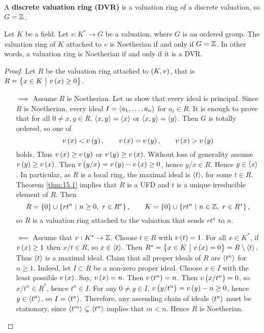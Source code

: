 
\begin{definition}
A \textbf{discrete valuation ring (DVR)} is a valuation ring of a discrete valuation, so $ G = \mathbb{Z} $.
\end{definition}

\begin{theorem}
\label{thm:15.4}
Let $ K $ be a field. Let $ v : K^* \to G $ be a valuation, where $ G $ is an ordered group. The valuation ring of $ K $ attached to $ v $ is Noetherian if and only if $ G = \mathbb{Z} $. In other words, a valuation ring is Noetherian if and only if it is a DVR.
\end{theorem}

\begin{proof}
Let $ R $ be the valuation ring attached to $ \br{K, v} $, that is $ R = \cbr{x \in K \st v\br{x} \ge 0} $.
\begin{itemize}
\item[$ \implies $] Assume $ R $ is Noetherian. Let us show that every ideal is principal. Since $ R $ is Noetherian, every ideal $ I = \left\langle a_1, \dots, a_n \right\rangle $ for $ a_i \in R $. It is enough to prove that for all $ 0 \ne x, y \in R $, $ \left\langle x, y \right\rangle = \left\langle x \right\rangle $ or $ \left\langle x, y \right\rangle = \left\langle y \right\rangle $. Then $ G $ is totally ordered, so one of
$$ v\br{x} < v\br{y}, \qquad v\br{x} = v\br{y}, \qquad v\br{x} > v\br{y} $$
holds. Thus $ v\br{x} \ge v\br{y} $ or $ v\br{y} \ge v\br{x} $. Without loss of generality assume $ v\br{y} \ge v\br{x} $. Then $ v\br{y / x} = v\br{y} - v\br{x} \ge 0 $, hence $ y / x \in R $. Hence $ y \in \left\langle x \right\rangle $. In particular, as $ R $ is a local ring, the maximal ideal is $ \left\langle t \right\rangle $, for some $ t \in R $. Theorem \ref{thm:15.1} implies that $ R $ is a UFD and $ t $ is a unique irreducible element of $ R $. Then
$$ R = \cbr{0} \cup \cbr{rt^n \st n \ge 0, \ r \in R^*}, \qquad K = \cbr{0} \cup \cbr{rt^n \st n \in \ZZ, \ r \in R^*}, $$
so $ R $ is a valuation ring attached to the valuation that sends $ rt^n $ to $ n $.
\item[$ \impliedby $] Assume that $ v : K^* \to \mathbb{Z} $. Choose $ t \in R $ with $ v\br{t} = 1 $. For all $ x \in K^* $, if $ v\br{x} \ge 1 $ then $ x / t \in R $, so $ x \in \left\langle t \right\rangle $. Then $ R^* = \cbr{x \in K \st v\br{x} = 0} = R \setminus \abr{t} $. Thus $ \left\langle t \right\rangle $ is a maximal ideal. Claim that all proper ideals of $ R $ are $ \left\langle t^n \right\rangle $ for $ n \ge 1 $. Indeed, let $ I \subset R $ be a non-zero proper ideal. Choose $ x \in I $ with the least possible $ v\br{x} $. Say, $ v\br{x} = n $. Then $ v\br{t^n} = n $. Then $ v\br{x / t^n} = 0 $, so $ x / t^n \in R^* $, hence $ t^n \in I $. For any $ 0 \ne y \in I $, $ v\br{y / t^n} = v\br{y} - n \ge 0 $, hence $ y \in \left\langle t^n \right\rangle $, so $ I = \left\langle t^n \right\rangle $. Therefore, any ascending chain of ideals $ \left\langle t^n \right\rangle $ must be stationary, since $ \left\langle t^m \right\rangle \subsetneq \left\langle t^n \right\rangle $ implies that $ m < n $. Hence $ R $ is Noetherian.
\end{itemize}
\end{proof}

